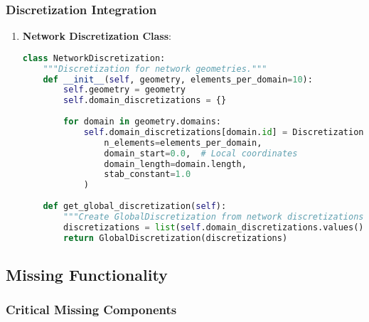 \subsubsection{Discretization Integration}

\begin{enumerate}
    \item \textbf{Network Discretization Class}:
    \begin{lstlisting}[language=Python, caption=Network-Aware Discretization]
class NetworkDiscretization:
    """Discretization for network geometries."""
    def __init__(self, geometry, elements_per_domain=10):
        self.geometry = geometry
        self.domain_discretizations = {}
        
        for domain in geometry.domains:
            self.domain_discretizations[domain.id] = Discretization(
                n_elements=elements_per_domain,
                domain_start=0.0,  # Local coordinates
                domain_length=domain.length,
                stab_constant=1.0
            )
    
    def get_global_discretization(self):
        """Create GlobalDiscretization from network discretizations."""
        discretizations = list(self.domain_discretizations.values())
        return GlobalDiscretization(discretizations)
    \end{lstlisting}
\end{enumerate}

\subsection{Missing Functionality}

\subsubsection{Critical Missing Components}

